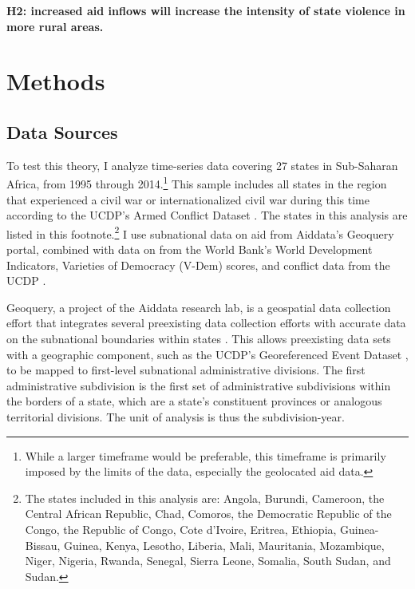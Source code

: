 \documentclass[12pt, letterpaper]{article}
\renewcommand{\cite}{\citep}
\begin{document}
\textbf{H2: increased aid inflows will increase the intensity of state violence in more rural areas.}
	
\section{Methods}

\subsection{Data Sources}

	To test this theory, I analyze time-series data covering 27 states in Sub-Saharan Africa, from 1995 through 2014.\footnote{While a larger timeframe would be preferable, this timeframe is primarily imposed by the limits of the data, especially the geolocated aid data.} This sample includes all states in the region that experienced a civil war or internationalized civil war during this time according to the UCDP’s Armed Conflict Dataset \cite{gleditsch2002armed, davies2022organized}. The states in this analysis are listed in this footnote.\footnote{The states included in this analysis are: Angola, Burundi, Cameroon, the Central African Republic, Chad, Comoros, the Democratic Republic of the Congo,  the Republic of Congo, Cote d’Ivoire, Eritrea, Ethiopia, Guinea-Bissau, Guinea, Kenya, Lesotho, Liberia, Mali, Mauritania, Mozambique, Niger, Nigeria, Rwanda, Senegal, Sierra Leone, Somalia, South Sudan, and Sudan.} I use subnational data on aid from Aiddata’s Geoquery portal, combined with data on from the World Bank’s World Development Indicators, Varieties of Democracy (V-Dem) scores, and conflict data from the UCDP \cite{goodman2019geoquery,wb2022, vdem2023, pemstein2018v, davies2022organized, sundberg2013introducing}. 

	Geoquery, a project of the Aiddata research lab, is a geospatial data collection effort that integrates several preexisting data collection efforts with accurate data on the subnational boundaries within states \cite{goodman2019geoquery}. This allows preexisting data sets with a geographic component, such as the UCDP’s Georeferenced Event Dataset \cite{davies2022organized, sundberg2013introducing}, to be mapped to first-level subnational administrative divisions. The first administrative subdivision is the first set of administrative subdivisions within the borders of a state, which are a state’s constituent provinces or analogous territorial divisions. The unit of analysis is thus the subdivision-year.
		
\end{document}
